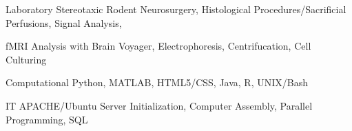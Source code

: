 

\begin{cvskills}

  \cvskill
    {Laboratory} %
    {Stereotaxic Rodent Neurosurgery, Histological Procedures/Sacrificial Perfusions, Signal Analysis,} %

  \cvskill
    { } %
    {fMRI Analysis with Brain Voyager, Electrophoresis, Centrifucation, Cell Culturing} %


  \cvskill
    {Computational} %
    {Python, MATLAB, HTML5/CSS, Java, R, UNIX/Bash} %

  \cvskill
    {IT} %
    {APACHE/Ubuntu Server Initialization, Computer Assembly, Parallel Programming, SQL} %


\end{cvskills}
